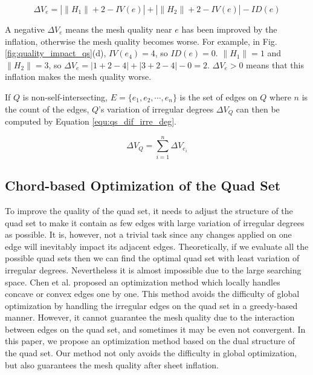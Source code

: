 \documentclass[final,5p,times,twocolumn]{elsarticle}
\begin{document}
\begin{equation}
\label{equ:dif_irre_deg_sim}
\Delta V_e = |\left \| H_1 \right \| + 2 - IV(e)| + |\left \| H_2 \right \| + 2 - IV(e)| - ID(e)
\end{equation}


A negative $\Delta V_e$ means the mesh quality near $e$ has been improved by the inflation, otherwise the mesh quality becomes worse. For example, in Fig. \ref{fig:quality_impact_qs}(d), $IV(e_4)=4$, so $ID(e)=0$. $\left \| H_1 \right \| = 1$ and $\left \| H_2 \right \| = 3$, so $\Delta V_e=|1 + 2 - 4| + |3 + 2 - 4| - 0 = 2$. $\Delta V_e > 0$ means that this inflation makes the mesh quality worse. 

If $Q$ is non-self-intersecting, $E=\{e_1,e_2,\cdots,e_n\}$ is the set of edges on $Q$ where $n$ is the count of the edges, $Q$'s variation of irregular degrees $\Delta V_Q$ can then be computed by Equation \ref{equ:qs_dif_irre_deg}.

\begin{equation}
\label{equ:qs_dif_irre_deg}
\Delta V_Q=\sum_{i=1}^{n}\Delta V_{e_i}
\end{equation}

\subsection{Chord-based Optimization of the Quad Set}
\label{sec:opt_qs_dual}
To improve the quality of the quad set, it needs to adjust the structure of the quad set to make it contain as few edges with large variation of irregular degrees as possible. It is, however, not a trivial task since any changes applied on one edge will inevitably impact its adjacent edges. Theoretically, if we evaluate all the possible quad sets then we can find the optimal quad set with least variation of irregular degrees. Nevertheless it is almost impossible due to the large searching space. Chen et al. proposed an optimization method which locally handles concave or convex edges one by one\cite{Chen:2015kf}. This method avoids the difficulty of global optimization by handling the irregular edges on the quad set in a greedy-based manner. However, it cannot guarantee the mesh quality due to the interaction between edges on the quad set, and sometimes it may be even not convergent. In this paper, we propose an optimization method based on the dual structure of the quad set. Our method not only avoids the difficulty in global optimization, but also guarantees the mesh quality after sheet inflation.
\end{document}
